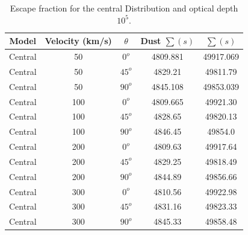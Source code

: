 \documentclass{article}
\theoremstyle{definition}
\theoremstyle{remark}
\begin{document}
\begin{table}[H]
\begin{center}
\begin{tabular}{|c|c|c|c|c|}
\hline 
Model & Velocity (km/s) & $\theta$ & Dust $\sum (s)$& $\sum (s)$ \\ 
\hline 
Central & 50 & $0^{o}$ & 4809.881 & 49917.069 \\ 
\hline 
Central & 50 & $45^{o}$ & 4829.21 & 49811.79 \\ 
\hline 
Central & 50 & $90^{o}$ & 4845.108 & 49853.039\\ 
\hline 
Central & 100 & $0^{o}$ & 4809.665 & 49921.30 \\  
\hline
Central & 100 & $45^{o}$ & 4828.65 & 49820.13 \\ 
\hline
Central & 100 & $90^{o}$ & 4846.45 & 49854.0 \\ 
\hline 
Central & 200 & $0^{o}$  & 4809.63 & 49917.64 \\ 
\hline 
Central & 200 & $45^{o}$ & 4829.25 & 49818.49 \\ 
\hline 
Central & 200 & $90^{o}$ & 4844.89 & 49856.66 \\ 
\hline 
Central & 300 & $ 0^{o}$ & 4810.56 & 49922.98\\ 
\hline 
Central & 300 & $45^{o}$ & 4831.16 & 49823.33\\ 
\hline  
Central & 300 & $90^{o}$ & 4845.33 & 49858.48\\ 
\hline  
\end{tabular}
\caption{Escape fraction for the central Distribution and optical depth $10^{5}$.} 
\end{center}
\end{table}




\end{document}
